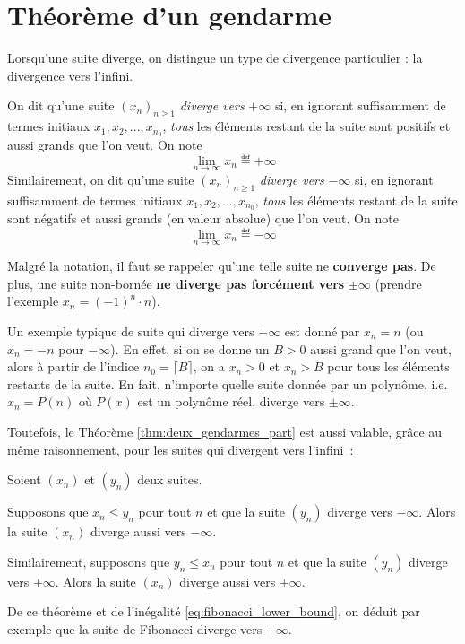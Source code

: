 \section{Théorème d'un gendarme}

Lorsqu'une suite diverge, on distingue un type de divergence particulier : la divergence vers l'infini.

\begin{boxdef}\label{def:divergence}
On dit qu'une suite $(x_n)_{n \geq 1}$ \emph{diverge vers} $+\infty$ si, en ignorant suffisamment de termes initiaux $x_1, x_2, ..., x_{n_0}$, \emph{tous} les éléments restant de la suite sont positifs et aussi grands que l'on veut. On note 
\[
\lim \limits_{n \to \infty} x_n \eqdef +\infty
\]
Similairement, on dit qu'une suite $(x_n)_{n \geq 1}$ \emph{diverge vers} $-\infty$ si, en ignorant suffisamment de termes initiaux $x_1, x_2, ..., x_{n_0}$, \emph{tous} les éléments restant de la suite sont négatifs et aussi grands (en valeur absolue) que l'on veut. On note 
\[
\lim \limits_{n \to \infty} x_n \eqdef -\infty
\]
\end{boxdef}

Malgré la notation, il faut se rappeler qu'une telle suite ne \textbf{converge pas}. De plus, une suite non-bornée \textbf{ne diverge pas forcément vers} $\pm \infty$ (prendre l'exemple $x_n = (-1)^n \cdot n$).

Un exemple typique de suite qui diverge vers $+\infty$ est donné par $x_n = n$ (ou $x_n = -n$ pour $-\infty$). En effet, si on se donne un $B > 0$ aussi grand que l'on veut, alors à partir de l'indice $n_0 = \lceil B \rceil$, on a $x_n > 0$ et $x_n > B$ pour tous les éléments restants de la suite. En fait, n'importe quelle suite donnée par un polynôme, i.e. $x_n = P(n)$ où $P(x)$ est un polynôme réel, diverge vers $\pm \infty$.

Toutefois, le Théorème \ref{thm:deux_gendarmes_part} est aussi valable, grâce au même raisonnement, pour les suites qui divergent vers l'infini~:

\begin{boxthm}\label{thm:un_gendarme}
Soient $(x_n)$ et $(y_n)$ deux suites. 

Supposons que $x_n \leq y_n$ pour tout $n$ et que la suite $(y_n)$ diverge vers $-\infty$. Alors la suite $(x_n)$ diverge aussi vers $-\infty$.

Similairement, supposons que $y_n \leq x_n$ pour tout $n$ et que la suite $(y_n)$ diverge vers $+\infty$. Alors la suite $(x_n)$ diverge aussi vers $+\infty$.
\end{boxthm}
De ce théorème et de l'inégalité \ref{eq:fibonacci_lower_bound}, on déduit par exemple que la suite de Fibonacci diverge vers $+\infty$.

